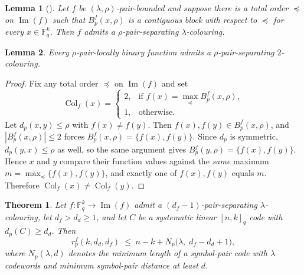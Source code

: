 \documentclass[11pt,draftclsnofoot,journal,onecolumn]{IEEEtran}
\newtheorem{lemma}{Lemma}
\newtheorem{theorem}{Theorem}
\begin{document}
    \begin{lemma}[{\cite{11250740}}]
    \label{lem:contig-block-cond}
    Let $f$ be $(\lambda,\rho)$-pair-bounded and suppose there is a total order $\preceq$ on $\operatorname{Im}(f)$ such that $B_p^f(x,\rho)$ is a contiguous block with respect to $\preceq$ for every $x \in \mathbb{F}_q^k$. Then $f$ admits a $\rho$-pair-separating $\lambda$-colouring.
    \end{lemma}

    \begin{lemma}
    \label{lem:binary-colouring}
    Every $\rho$-pair-locally binary function admits a $\rho$-pair-separating $2$-colouring.
    \end{lemma}

    \begin{proof}
    Fix any total order $\preceq$ on $\operatorname{Im}(f)$ and set
    \[
    \operatorname{Col}_f(x) =
    \begin{cases}
        2, & \text{if } f(x) = \max_{\preceq} B_p^f(x,\rho),\\
        1, & \text{otherwise.}
    \end{cases}
    \]
    Let $d_p(x,y) \le \rho$ with $f(x) \neq f(y)$. Then $f(x), f(y) \in B_p^f(x,\rho)$, and $|B_p^f(x,\rho)| \le 2$ forces $B_p^f(x,\rho) = \{f(x),f(y)\}$. Since $d_p$ is symmetric, $d_p(y,x) \le \rho$ as well, so the same argument gives $B_p^f(y,\rho) = \{f(x),f(y)\}$. Hence $x$ and $y$ compare their function values against the \emph{same} maximum $m = \max_{\preceq}\{f(x),f(y)\}$, and exactly one of $f(x),f(y)$ equals $m$. Therefore $\operatorname{Col}_f(x) \neq \operatorname{Col}_f(y)$.
    \end{proof}


    \begin{theorem}
    \label{the:locally-red-boun}
    Let $f : \mathbb{F}_q^k \to \operatorname{Im}(f)$ admit a $(d_f-1)$-pair-separating $\lambda$-colouring, let $d_f > d_d \ge 1$, and let $C$ be a systematic linear $[n,k]_q$ code with $d_p(C) \ge d_d$. Then
    \[
    r_p^f(k, d_d, d_f) \;\le\; n - k + N_p\bigl(\lambda,\; d_f - d_d + 1\bigr),
    \]
    where $N_p(\lambda,d)$ denotes the minimum length of a symbol-pair code with $\lambda$ codewords and minimum symbol-pair distance at least $d$.
    \end{theorem}
\end{document}
